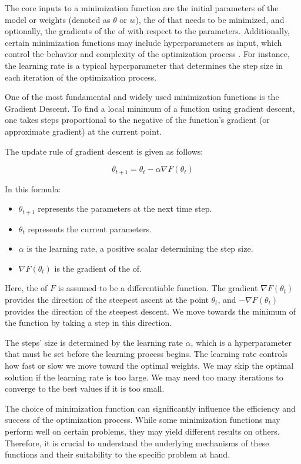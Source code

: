 \documentclass[
  a4paper,  %
  twoside,  %
  bibliography=totoc,
  headsepline,
  cleardoublepage=empty,
  parskip=half,
  draft=false
]{scrbook}
\begin{document}
The core inputs to a minimization function are the initial parameters of the model or weights (denoted as \(\theta\) or \(w\)),
the \gls{of} that needs to be minimized, and optionally, the gradients of the \gls{of} with respect to the parameters.
Additionally, certain minimization functions may include hyperparameters as input, which control the behavior and complexity of the optimization process \cite{Virtanen2020}.
For instance, the learning rate is a typical hyperparameter that determines the step size in each iteration of the optimization process.

One of the most fundamental and widely used minimization functions is the Gradient Descent.
To find a local minimum of a function using gradient descent, one takes steps proportional to the negative of the function's gradient (or approximate gradient) at the current point.

The update rule of gradient descent is given as follows:

\[
\theta_{t+1} = \theta_t - \alpha \nabla F(\theta_t)
\]

In this formula:

\begin{itemize}
  \item \(\theta_{t+1}\) represents the parameters at the next time step.
  \item \(\theta_t\) represents the current parameters.
  \item \(\alpha\) is the learning rate, a positive scalar determining the step size.
  \item \(\nabla F(\theta_t)\) is the gradient of the \gls{of}.
\end{itemize}

Here, the \gls{of} \(F\) is assumed to be a differentiable function.
The gradient \(\nabla F(\theta_t)\) provides the direction of the steepest ascent at the point \(\theta_t\), and \(-\nabla F(\theta_t)\) provides the direction of the steepest descent.
We move towards the minimum of the function by taking a step in this direction.

The steps' size is determined by the learning rate \(\alpha\), which is a hyperparameter that must be set before the learning process begins.
The learning rate controls how fast or slow we move toward the optimal weights.
We may skip the optimal solution if the learning rate is too large.
We may need too many iterations to converge to the best values if it is too small.

The choice of minimization function can significantly influence the efficiency and success of the optimization process.
While some minimization functions may perform well on certain problems, they may yield different results on others.
Therefore, it is crucial to understand the underlying mechanisms of these functions and their suitability to the specific problem at hand.
\end{document}
